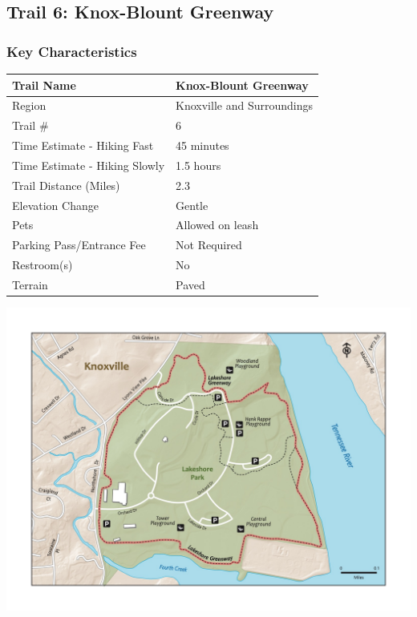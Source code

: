 \documentclass[
  letterpaper,
  DIV=11,
  numbers=noendperiod]{scrartcl}
\begin{document}
\hypertarget{trail-6-knox-blount-greenway}{%
\subsection{Trail 6: Knox-Blount
Greenway}\label{trail-6-knox-blount-greenway}}

\hypertarget{key-characteristics-5}{%
\subsubsection{Key Characteristics}\label{key-characteristics-5}}

\begin{longtable}[]{@{}ll@{}}
\toprule\noalign{}
Trail Name & Knox-Blount Greenway \\
\midrule\noalign{}
\endhead
\bottomrule\noalign{}
\endlastfoot
Region & Knoxville and Surroundings \\
Trail \# & 6 \\
Time Estimate - Hiking Fast & 45 minutes \\
Time Estimate - Hiking Slowly & 1.5 hours \\
Trail Distance (Miles) & 2.3 \\
Elevation Change & Gentle \\
Pets & Allowed on leash \\
Parking Pass/Entrance Fee & Not Required \\
Restroom(s) & No \\
Terrain & Paved \\
\end{longtable}

\includegraphics{maps/trail-03-map.jpeg}
\end{document}
